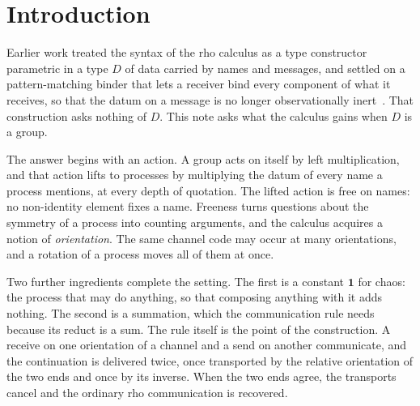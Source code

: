 \documentclass[11pt]{article}
\theoremstyle{definition}
\theoremstyle{remark}
\newcommand{\chaos}{\mathbf{1}}
\begin{document}
\section{Introduction}

Earlier work treated the syntax of the rho calculus as a type constructor
parametric in a type $D$ of data carried by names and messages, and settled on
a pattern-matching binder that lets a receiver bind every component of what it
receives, so that the datum on a message is no longer observationally
inert~\cite{wsh}. That construction asks nothing of $D$. This note asks what
the calculus gains when $D$ is a group.

The answer begins with an action. A group acts on itself by left
multiplication, and that action lifts to processes by multiplying the datum of
every name a process mentions, at every depth of quotation. The lifted action
is free on names: no non-identity element fixes a name. Freeness turns
questions about the symmetry of a process into counting arguments, and the
calculus acquires a notion of \emph{orientation}. The same channel code may
occur at many orientations, and a rotation of a process moves all of them at
once.

Two further ingredients complete the setting. The first is a constant
$\chaos$ for chaos: the process that may do anything, so that composing
anything with it adds nothing. The second is a summation, which the
communication rule needs because its reduct is a sum. The rule itself is the
point of the construction. A receive on one orientation of a channel and a
send on another communicate, and the continuation is delivered twice, once
transported by the relative orientation of the two ends and once by its
inverse. When the two ends agree, the transports cancel and the ordinary rho
communication is recovered.
\end{document}
